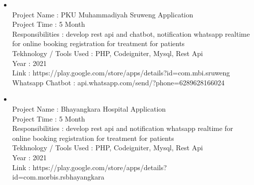 \begin{itemize}
    \item {\color{LinkedInBlue} }\\ 
    \mybullet Project Name : PKU Muhammadiyah Sruweng Application \\
    \mybullet Project Time : 5 Month \\
    \mybullet Responsibilities : develop rest api and chatbot, notification whatsapp realtime for online booking registration for treatment for patients \\
    \mybullet Tekhnology / Tools Used : PHP, Codeigniter, Mysql, Rest Api \\
    \mybullet Year : 2021 \\
    \mybullet Link : https://play.google.com/store/apps/details?id=com.mbi.sruweng \\
    \mybullet Whatsapp Chatbot : api.whatsapp.com/send/?phone=6289628166024

    \item {\color{LinkedInBlue} }\\ 
    \mybullet Project Name : Bhayangkara Hospital Application \\
    \mybullet Project Time : 5 Month \\
    \mybullet Responsibilities : develop rest api and notification whatsapp realtime for online booking registration for treatment for patients \\
    \mybullet Tekhnology / Tools Used : PHP, Codeigniter, Mysql, Rest Api \\
    \mybullet Year : 2021 \\
    \mybullet Link : https://play.google.com/store/apps/details?id=com.morbis.rsbhayangkara \\


\end{itemize}

\vspace{1in}